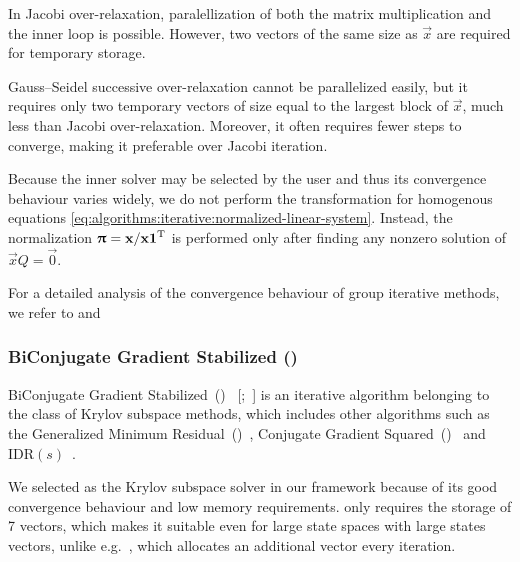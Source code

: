 In Jacobi over-relaxation, paralellization of both the matrix
multiplication and the inner loop is possible. However, two vectors of
the same size as $\vec{x}$ are required for temporary storage.

Gauss--Seidel successive over-relaxation cannot be parallelized easily,
but it requires only two temporary vectors of size equal to the largest
block of $\vec{x}$, much less than Jacobi over-relaxation. Moreover, it
often requires fewer steps to converge, making it preferable over
Jacobi iteration.

Because the inner solver may be selected by the user and thus its
convergence behaviour varies widely, we do not perform the
transformation for homogenous equations
\eqref{eq:algorithms:iterative:normalized-linear-system}. Instead, the
normalization $\bm{\mathrm{\uppi}} = \bm{\mathrm{x}} / \bm{\mathrm{x}}\bm{\mathrm{1}}^{\mathrm{T}}$ is performed
only after finding any nonzero solution of $\vec{x} Q = \vec{0}$.

For a detailed analysis of the convergence behaviour of group
iterative methods, we refer to
\citet[Chapter~14]{greenbaum1997iterative} and \citet{}

\subsubsection{BiConjugate Gradient Stabilized ()}
\label{ssec:algorithms:bicgstab}

BiConjugate Gradient Stabilized~()%
~\mkbibbrackets{;~}
is an iterative algorithm belonging to the class of Krylov subspace
methods, which includes other algorithms such as the Generalized
Minimum Residual~()~\citep{saad1986gmres}, Conjugate Gradient
Squared~()~\citep{sonneveld1989cgs} and
IDR$(s)$~\citep{sonneveld2008idr}.

We selected  as the Krylov subspace solver in our
framework because of its good convergence behaviour and low memory
requirements.  only requires the storage of 7
vectors, which makes it suitable even for large state spaces with
large states vectors, unlike e.g.~, which allocates an
additional vector every iteration.

